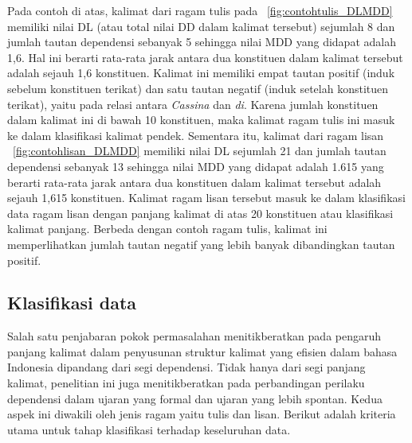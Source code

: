 Pada contoh di atas, kalimat dari ragam tulis pada \pic~\ref{fig:contohtulis_DLMDD} memiliki nilai DL (atau total nilai DD dalam kalimat tersebut) sejumlah 8 dan jumlah tautan dependensi sebanyak 5 sehingga nilai MDD yang didapat adalah 1,6. Hal ini berarti rata-rata jarak antara dua konstituen dalam kalimat tersebut adalah sejauh 1,6 konstituen. Kalimat ini memiliki empat tautan positif (induk sebelum konstituen terikat) dan satu tautan negatif (induk setelah konstituen terikat), yaitu pada relasi antara \textit{Cassina} dan \textit{di}. Karena jumlah konstituen dalam kalimat ini di bawah 10 konstituen, maka kalimat ragam tulis ini masuk ke dalam klasifikasi kalimat pendek. Sementara itu, kalimat dari ragam lisan \pic~\ref{fig:contohlisan_DLMDD} memiliki nilai DL sejumlah 21 dan jumlah tautan dependensi sebanyak 13 sehingga nilai MDD yang didapat adalah 1.615 yang berarti rata-rata jarak antara dua konstituen dalam kalimat tersebut adalah sejauh 1,615 konstituen. Kalimat ragam lisan tersebut masuk ke dalam klasifikasi data ragam lisan dengan panjang kalimat di atas 20 konstituen atau klasifikasi kalimat panjang. Berbeda dengan contoh ragam tulis, kalimat ini memperlihatkan jumlah tautan negatif yang lebih banyak dibandingkan tautan positif.

\subsection{Klasifikasi data}
Salah satu penjabaran pokok permasalahan menitikberatkan pada pengaruh panjang kalimat dalam penyusunan struktur kalimat yang efisien dalam bahasa Indonesia dipandang dari segi dependensi. Tidak hanya dari segi panjang kalimat, penelitian ini juga menitikberatkan pada perbandingan perilaku dependensi dalam ujaran yang formal dan ujaran yang lebih spontan. Kedua aspek ini diwakili oleh jenis ragam yaitu tulis dan lisan. Berikut adalah kriteria utama untuk tahap klasifikasi terhadap keseluruhan data.

